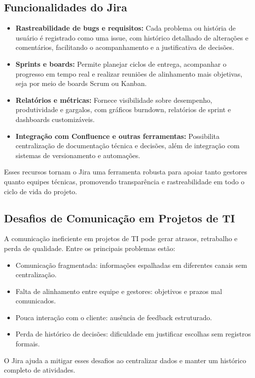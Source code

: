 \documentclass[12pt]{article}
\begin{document}
\subsection{Funcionalidades do Jira}
\begin{itemize}
    \item \textbf{Rastreabilidade de bugs e requisitos:} Cada problema ou história de usuário é registrado como uma issue, com histórico detalhado de alterações e comentários, facilitando o acompanhamento e a justificativa de decisões.
    \item \textbf{Sprints e boards:} Permite planejar ciclos de entrega, acompanhar o progresso em tempo real e realizar reuniões de alinhamento mais objetivas, seja por meio de boards Scrum ou Kanban.
    \item \textbf{Relatórios e métricas:} Fornece visibilidade sobre desempenho, produtividade e gargalos, com gráficos burndown, relatórios de sprint e dashboards customizáveis.
    \item \textbf{Integração com Confluence e outras ferramentas:} Possibilita centralização de documentação técnica e decisões, além de integração com sistemas de versionamento e automações.
\end{itemize}

Esses recursos tornam o Jira uma ferramenta robusta para apoiar tanto gestores quanto equipes técnicas, promovendo transparência e rastreabilidade em todo o ciclo de vida do projeto.

\subsection{Desafios de Comunicação em Projetos de TI}
A comunicação ineficiente em projetos de TI pode gerar atrasos, retrabalho e perda de qualidade. Entre os principais problemas estão:
\begin{itemize}
    \item Comunicação fragmentada: informações espalhadas em diferentes canais sem centralização.
    \item Falta de alinhamento entre equipe e gestores: objetivos e prazos mal comunicados.
    \item Pouca interação com o cliente: ausência de feedback estruturado.
    \item Perda de histórico de decisões: dificuldade em justificar escolhas sem registros formais.
\end{itemize}
O Jira ajuda a mitigar esses desafios ao centralizar dados e manter um histórico completo de atividades.
\end{document}
